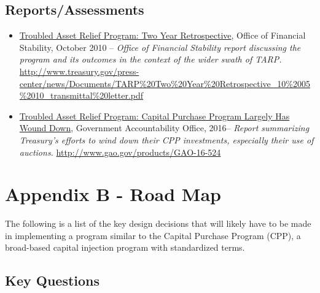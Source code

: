 \documentclass[12pt]{article}
\begin{document}
\subsection{Reports/Assessments}

\begin{itemize}
\item
\ul{Troubled
 Asset Relief Program: Two Year Retrospective}, Office of Financial
 Stability, October 2010 -- \emph{Office of Financial Stability report
 discussing the program and its outcomes in the context of the wider
 swath of TARP.} \url{http://www.treasury.gov/press-center/news/Documents/TARP\%20Two\%20Year\%20Retrospective_10\%2005\%2010_transmittal\%20letter.pdf}

 \item
\ul{Troubled Asset Relief Program: Capital Purchase Program Largely Has Wound Down}, Government Accountability Office, 2016-- \emph{Report summarizing Treasury's efforts to wind down their CPP investments, especially their use of auctions.} \url{http://www.gao.gov/products/GAO-16-524}



\end{itemize}

\section{Appendix B - Road Map}

The following is a list of the key design decisions that will likely have to be made in implementing a program similar to the Capital Purchase Program (CPP), a broad-based capital injection program with standardized terms.

\subsection{Key Questions}
\end{document}
